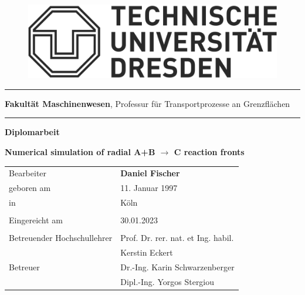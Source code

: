 \documentclass[../thesis.tex]{subfiles}
\begin{document}
\begin{titlepage}
	\begin{addmargin}[22mm]{0mm}
		\begin{figure}[t]
			\hspace*{5mm}\includegraphics[scale=0.35]{figs/Logo.png} \vspace{-8mm}
		\end{figure}
		\rule{140mm}{.4pt}
		\vspace{0.4mm}

		\scriptsize { {\bfseries Fakultät Maschinenwesen},
			Professur für Transportprozesse an Grenzflächen}
		\vspace{-1.4mm}

		\rule{140mm}{.4pt}
		\vspace{2cm}

		{\Large \bfseries Diplomarbeit}
		\vspace{2cm}

		{\LARGE \bfseries Numerical simulation of radial A+B $\rightarrow$ C reaction fronts \par}
		\vspace{2cm}
		\begin{addmargin}[-2mm]{0mm}
			\large
			\begin{tabular}{l l}
			  Bearbeiter                   & {\bfseries Daniel Fischer} \\
			  geboren am                   & 11. Januar 1997 \\
			  in                           & Köln \\ \\
			  Eingereicht am               & 30.01.2023 \\ \\
			  Betreuender Hochschullehrer  & Prof. Dr. rer. nat. et Ing. habil. \\ 
			  							   & Kerstin Eckert \\
			  Betreuer                     & Dr.-Ing. Karin Schwarzenberger  \\
			  							   & Dipl.-Ing. Yorgos Stergiou \\

			\end{tabular}
		\end{addmargin}
	\end{addmargin}
\end{titlepage}
\end{document}
